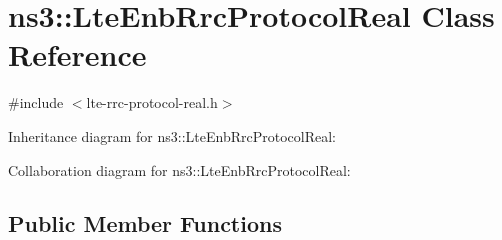 \hypertarget{classns3_1_1LteEnbRrcProtocolReal}{}\section{ns3\+:\+:Lte\+Enb\+Rrc\+Protocol\+Real Class Reference}
\label{classns3_1_1LteEnbRrcProtocolReal}


{\ttfamily \#include $<$lte-\/rrc-\/protocol-\/real.\+h$>$}



Inheritance diagram for ns3\+:\+:Lte\+Enb\+Rrc\+Protocol\+Real\+:


Collaboration diagram for ns3\+:\+:Lte\+Enb\+Rrc\+Protocol\+Real\+:
\subsection*{Public Member Functions}
